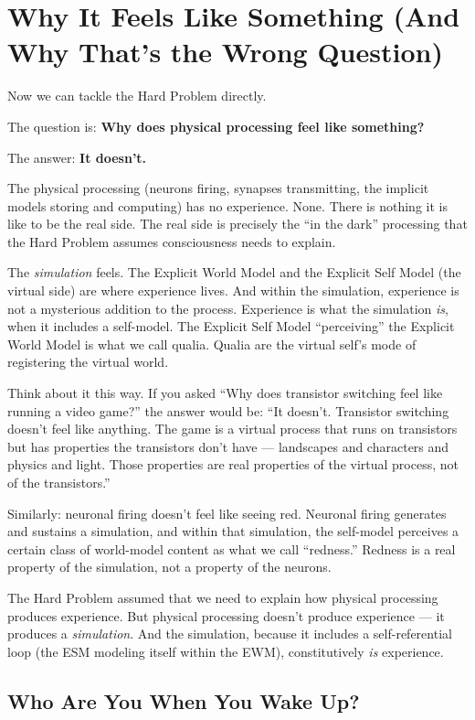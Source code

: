 \documentclass[11pt, twoside, openright]{book}
\begin{document}
\chapter{Why It Feels Like Something (And Why That's the Wrong Question)}

Now we can tackle the Hard Problem directly.

The question is: \textbf{Why does physical processing feel like something?}

The answer: \textbf{It doesn't.}

The physical processing (neurons firing, synapses transmitting, the implicit models storing and computing) has no experience. None. There is nothing it is like to be the real side. The real side is precisely the ``in the dark'' processing that the Hard Problem assumes consciousness needs to explain.

The \textit{simulation} feels. The Explicit World Model and the Explicit Self Model (the virtual side) are where experience lives. And within the simulation, experience is not a mysterious addition to the process. Experience is what the simulation \textit{is}, when it includes a self-model. The Explicit Self Model ``perceiving'' the Explicit World Model is what we call qualia. Qualia are the virtual self's mode of registering the virtual world.

Think about it this way. If you asked ``Why does transistor switching feel like running a video game?'' the answer would be: ``It doesn't. Transistor switching doesn't feel like anything. The game is a virtual process that runs on transistors but has properties the transistors don't have --- landscapes and characters and physics and light. Those properties are real properties of the virtual process, not of the transistors.''

Similarly: neuronal firing doesn't feel like seeing red. Neuronal firing generates and sustains a simulation, and within that simulation, the self-model perceives a certain class of world-model content as what we call ``redness.'' Redness is a real property of the simulation, not a property of the neurons.

The Hard Problem assumed that we need to explain how physical processing produces experience. But physical processing doesn't produce experience --- it produces a \textit{simulation}. And the simulation, because it includes a self-referential loop (the ESM modeling itself within the EWM), constitutively \textit{is} experience.

\section*{Who Are You When You Wake Up?}
\end{document}
